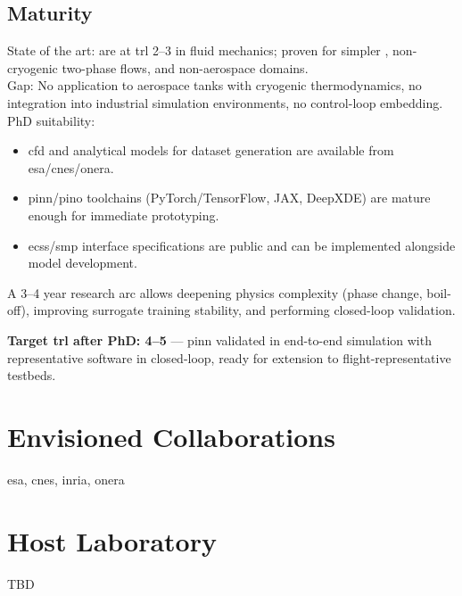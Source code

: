 \documentclass[12pt]{article}
\begin{document}
	
	\subsection*{Maturity}
	
	
	State of the art:  are at \acrshort{trl} 2–3 in fluid mechanics; proven for simpler , non-cryogenic two-phase flows, and non-aerospace domains.
	\\
	
	Gap: No application to aerospace tanks with cryogenic thermodynamics, no integration into industrial simulation environments, no control-loop embedding.
	\\
		
	PhD suitability:
	
	\begin{itemize}
		\item \acrshort{cfd} and analytical models for dataset generation are available from \acrshort{esa}/\acrshort{cnes}/\acrshort{onera}.
		
		\item \acrshort{pinn}/\acrshort{pino} toolchains (PyTorch/TensorFlow, JAX, DeepXDE) are mature enough for immediate prototyping.
		
		\item \acrshort{ecss}/\acrshort{smp} interface specifications are public and can be implemented alongside model development.
		
	\end{itemize}	
	A 3–4 year research arc allows deepening physics complexity (phase change, boil-off), improving surrogate training stability, and performing closed-loop validation.
	
	\textbf{Target \acrshort{trl} after PhD: 4–5} — \acrshort{pinn} validated in end-to-end simulation with representative software in closed-loop, ready for extension to flight-representative testbeds.
	
	
	
	\nocite{*}
	
	\printbibliography[title=Indicative Bibliography]
	
	\section*{Envisioned Collaborations}
	
	\acrshort{esa}, \acrshort{cnes}, \acrshort{inria}, \acrshort{onera}
	
	\section*{Host Laboratory}
	
	TBD
	
	\printglossaries
	
\end{document}
